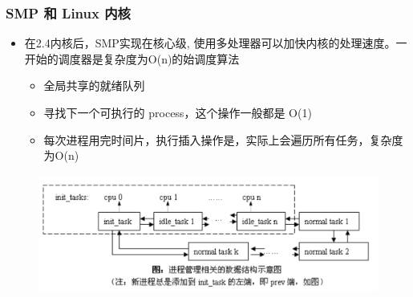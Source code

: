 \begin{frame}
	\frametitle{SMP 和 Linux 内核}

	\begin{itemize}
	
	\item 在2.4内核后，SMP实现在核心级, 使用多处理器可以加快内核的处理速度。一开始的调度器是复杂度为O(n)的始调度算法
	
		\begin{itemize}
		\item 全局共享的就绪队列
		\item 寻找下一个可执行的 process，这个操作一般都是 O(1)
		\item 每次进程用完时间片，执行插入操作是，实际上会遍历所有任务，复杂度为O(n)

		\end{itemize}
	\end{itemize}
	
    \begin{figure}
	\includegraphics[width=.8\textwidth]{figs/linux-2.4-sched.png}
    \end{figure}


\end{frame}


